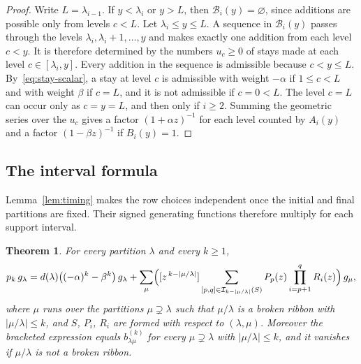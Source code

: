 \documentclass[11pt]{amsart}
\numberwithin{equation}{section}
\newtheorem{theorem}{Theorem}[section]
\theoremstyle{definition}
\theoremstyle{remark}
\newcommand{\cI}{\mathcal I}
\newcommand{\cB}{\mathcal B}
\begin{document}
\begin{proof}
Write $L=\lambda_{i-1}$. If $y<\lambda_i$ or $y>L$, then $\cB_i(y)=\varnothing$,
since additions are possible only from levels $c<L$. Let
$\lambda_i\leq y\leq L$. A sequence in $\cB_i(y)$ passes through the levels
$\lambda_i,\lambda_i+1,\dots,y$ and makes exactly one addition from each level
$c<y$. It is therefore determined by the numbers $u_c\geq0$ of stays made at
each level $c\in[\lambda_i,y]$. Every addition in the sequence is
admissible because $c<y\leq L$. By~\eqref{eq:stay-scalar}, a stay at level
$c$ is admissible with weight $-\alpha$ if $1\leq c<L$ and with weight
$\beta$ if $c=L$, and it is not admissible if $c=0<L$. The level $c=L$ can
occur only as $c=y=L$, and then only if $i\geq2$. Summing the geometric
series over the $u_c$ gives a factor $(1+\alpha z)^{-1}$ for each level
counted by $A_i(y)$ and a factor $(1-\beta z)^{-1}$ if $B_i(y)=1$.
\end{proof}


\subsection{The interval formula}
Lemma~\ref{lem:timing} makes the row choices independent once
the initial and final partitions are fixed. Their signed
generating functions therefore multiply for each support
interval.

\begin{theorem}\label{thm:boundary}
For every partition $\lambda$ and every $k\geq1$,
\[
 p_k\,g_\lambda=d(\lambda)\bigl((-\alpha)^k-\beta^k\bigr)\,g_\lambda
 +\sum_{\mu}\Bigl([z^{\,k-|\mu/\lambda|}]\sum_{[p,q]\in\cI_{k-|\mu/\lambda|}(S)}
 P_p(z)\prod_{i=p+1}^{q}R_i(z)\Bigr)\,g_\mu ,
\]
where $\mu$ runs over the partitions $\mu\supsetneq\lambda$ such that
$\mu/\lambda$ is a broken ribbon with $|\mu/\lambda|\leq k$, and $S$,
$P_i$, $R_i$ are formed with respect to $(\lambda,\mu)$. Moreover the
bracketed expression equals $b^{(k)}_{\lambda\mu}$ for every
$\mu\supsetneq\lambda$ with $|\mu/\lambda|\leq k$, and it vanishes if
$\mu/\lambda$ is not a broken ribbon.
\end{theorem}
\end{document}
